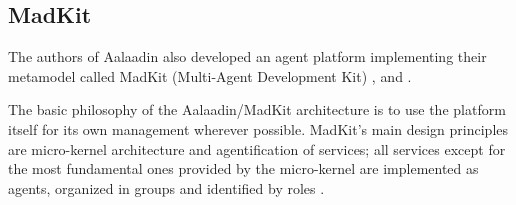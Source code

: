 \subsection{MadKit}

The authors of Aalaadin also developed an agent platform implementing their metamodel called MadKit (Multi-Agent Development Kit)
\cite{Ferber97}, \cite{Ferber98} and \cite{Gutknecht00}.

The basic philosophy of the Aalaadin/MadKit architecture is to use the platform itself for its own management wherever possible.
MadKit's main design principles are micro-kernel architecture and agentification of services;
all services except for the most fundamental ones provided by the micro-kernel are implemented as agents, organized in groups and identified by roles \cite{Ferber98}.